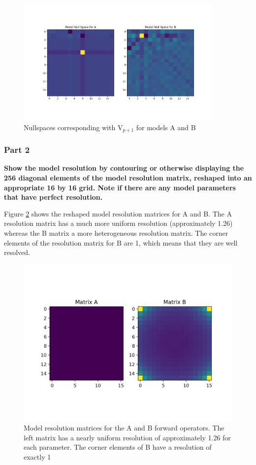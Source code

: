 \documentclass{article}
\begin{document}
\begin{figure}[ht!]
    \centering
    \includegraphics[width=4in]{Nullspace.png}
    \caption{Nullspaces corresponding with V$_{p+1}$ for models A and B}
    \label{nullspace}
\end{figure}

\subsubsection*{Part 2}\textbf{Show the model resolution by contouring or otherwise displaying the 256 diagonal elements of the model resolution matrix, reshaped into an appropriate 16 by 16 grid. Note if there are any model parameters that have perfect resolution.}

Figure \ref{resolution} shows the reshaped model resolution matrices for A and B. The A resolution matrix has a much more uniform resolution (approximately 1.26) whereas the B matrix a more heterogeneous resolution matrix. The corner elements of the resolution matrix for B are 1, which means that they are well resolved. 

\begin{figure}[h!]
    \centering
    \includegraphics[width=4.5in]{resolution_matrices.png}
    \caption{Model resolution matrices for the A and B forward operators. The left matrix has a nearly uniform resolution of approximately 1.26 for each parameter. The corner elements of B have a resolution of exactly 1}
    \label{resolution}
\end{figure}
\end{document}
